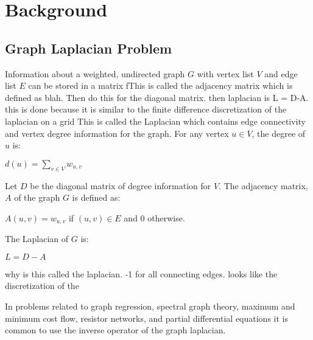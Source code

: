 \documentclass{article}
\begin{document}
\section{Background}
\subsection{Graph Laplacian Problem}
Information about a weighted, undirected graph $G$ with vertex list $V$ and edge list $E$ can be stored in a matrix fThis is called the adjacency matrix which is defined as blah. Then do this for the diagonal matrix. then laplacian is L = D-A. this is done because it is similar to the finite difference discretization of the laplacian on a grid This is called the Laplacian which contains edge connectivity and vertex degree information for the graph. For any vertex $u \in V$, the degree of $u$ is:\\
\begin{center} $d(u) = \sum_{v \in V} w_{u,v}$ \cite{Spielman:2010} \\
\end{center}
Let $D$ be the diagonal matrix of degree information for $V$. The adjacency matrix, $A$ of the graph $G$ is defined as:\\
\begin{center} $A(u,v) = w_{u,v}$ if $(u,v) \in E$ and $0$ otherwise. \cite{Spielman:2010} \\
\end{center}
The Laplacian of $G$ is:\\
\begin{center} $L = D-A$ \cite{Spielman:2010} \\
\end{center}

why is this called the laplacian. -1 for all connecting edges. looks like the discretization of the 

In problems related to graph regression, spectral graph theory, maximum and minimum cost flow, resistor networks, and partial differential equations it is common to use the inverse operator of the graph laplacian. \cite{Spielman:2010}
\end{document}
